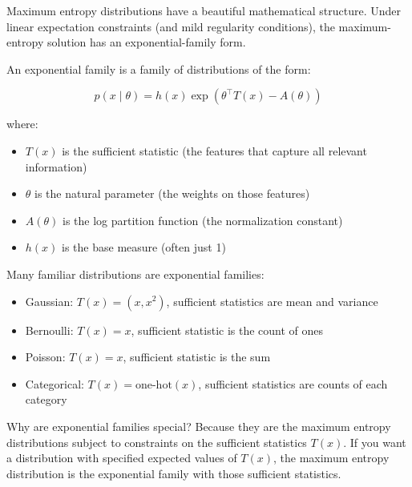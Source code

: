 Maximum entropy distributions have a beautiful mathematical structure. Under linear expectation constraints (and mild regularity conditions), the maximum-entropy solution has an exponential-family form.

An exponential family is a family of distributions of the form:

\begin{equation}
p(x \mid \theta) = h(x) \exp\left(\theta^\top T(x) - A(\theta)\right)
\end{equation}

where:
\begin{itemize}
\item $T(x)$ is the sufficient statistic (the features that capture all relevant information)
\item $\theta$ is the natural parameter (the weights on those features)
\item $A(\theta)$ is the log partition function (the normalization constant)
\item $h(x)$ is the base measure (often just 1)
\end{itemize}

\vspace{1em}

Many familiar distributions are exponential families:

\begin{itemize}
\item Gaussian: $T(x) = (x, x^2)$, sufficient statistics are mean and variance

\item Bernoulli: $T(x) = x$, sufficient statistic is the count of ones

\item Poisson: $T(x) = x$, sufficient statistic is the sum

\item Categorical: $T(x) = \text{one-hot}(x)$, sufficient statistics are counts of each category
\end{itemize}

\vspace{1em}

Why are exponential families special? Because they are the maximum entropy distributions subject to constraints on the sufficient statistics $T(x)$. If you want a distribution with specified expected values of $T(x)$, the maximum entropy distribution is the exponential family with those sufficient statistics.

\vspace{1.5em}

